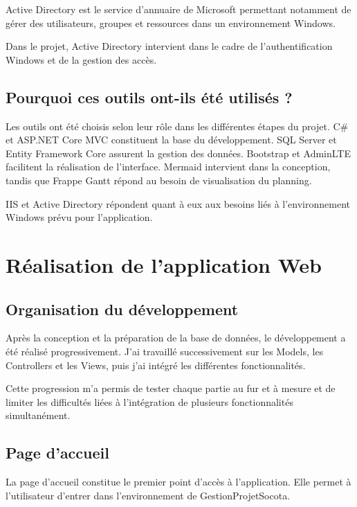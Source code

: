 \documentclass[12pt,a4paper,oneside]{report}
\begin{document}
Active Directory est le service d'annuaire de Microsoft permettant notamment de gérer des utilisateurs, groupes et ressources dans un environnement Windows.

Dans le projet, Active Directory intervient dans le cadre de l'authentification Windows et de la gestion des accès.

\section{Pourquoi ces outils ont-ils été utilisés ?}

Les outils ont été choisis selon leur rôle dans les différentes étapes du projet. C\# et ASP.NET Core MVC constituent la base du développement. SQL Server et Entity Framework Core assurent la gestion des données. Bootstrap et AdminLTE facilitent la réalisation de l'interface. Mermaid intervient dans la conception, tandis que Frappe Gantt répond au besoin de visualisation du planning.

IIS et Active Directory répondent quant à eux aux besoins liés à l'environnement Windows prévu pour l'application.

\chapter{Réalisation de l'application Web}

\section{Organisation du développement}

Après la conception et la préparation de la base de données, le développement a été réalisé progressivement. J'ai travaillé successivement sur les Models, les Controllers et les Views, puis j'ai intégré les différentes fonctionnalités.

Cette progression m'a permis de tester chaque partie au fur et à mesure et de limiter les difficultés liées à l'intégration de plusieurs fonctionnalités simultanément.

\section{Page d'accueil}

La page d'accueil constitue le premier point d'accès à l'application. Elle permet à l'utilisateur d'entrer dans l'environnement de GestionProjetSocota.
\end{document}
